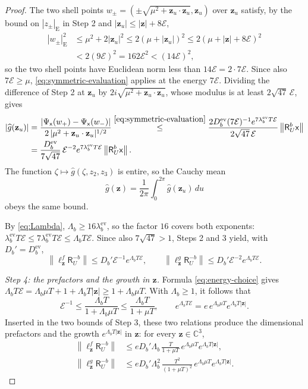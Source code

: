 \documentclass[11pt]{amsart}
\numberwithin{equation}{section}
\theoremstyle{definition}
\newcommand{\C}{\mathbb C}
\newcommand{\Res}{\mathsf R}
\newcommand{\sx}{\mathsf x}
\newcommand{\bz}{\mathbf z}
\newcommand{\Energy}{\mathcal E}
\newcommand{\norm}[1]{\left\|#1\right\|}
\newcommand{\wh}[1]{\widehat{#1}}
\begin{document}
\begin{proof}
The two shell points
\(w_\pm=(\pm\sqrt{\mu^2+\bz_u\cdot\bz_u},\bz_u)\) over \(\bz_u\)
satisfy, by the bound on \(|z_\pm|_{\mathrm E}\) in Step 2 and \(|\bz_u|\le|\bz|+8\Energy\),
\begin{align*}
 |w_\pm|_{\mathrm E}^2
 &\le\mu^2+2|\bz_u|^2
 \le2(\mu+|\bz_u|)^2
 \le2(\mu+|\bz|+8\Energy)^2\\
 &<2(9\Energy)^2=162\Energy^2<(14\Energy)^2,
\end{align*}
so the two shell points have Euclidean norm less than
\(14\Energy=2\cdot7\Energy\). Since also \(7\Energy\ge\mu\),
\eqref{eq:symmetric-evaluation} applies at the energy \(7\Energy\).
Dividing the difference of Step 2 at \(\bz_u\) by
\(2i\sqrt{\mu^2+\bz_u\cdot\bz_u}\), whose modulus is at least
\(2\sqrt{47}\,\Energy\), gives
\begin{align*}
 |\wh g(\bz_u)|
 &=\frac{|\Psi_\sx(w_+)-\Psi_\sx(w_-)|}
        {2\,|\mu^2+\bz_u\cdot\bz_u|^{1/2}}
 \overset{\eqref{eq:symmetric-evaluation}}{\le}
 \frac{2D_b^{\mathrm{ev}}(7\Energy)^{-1}
       e^{7\lambda_b^{\mathrm{ev}}T\Energy}}
      {2\sqrt{47}\,\Energy}
 \norm{\Res_U^b\sx}\\
 &=\frac{D_b^{\mathrm{ev}}}{7\sqrt{47}}\,\Energy^{-2}
   e^{7\lambda_b^{\mathrm{ev}}T\Energy}\norm{\Res_U^b\sx}.
\end{align*}
The function \(\zeta\mapsto\wh g(\zeta,z_2,z_3)\) is entire, so the
Cauchy mean
\[
 \wh g(\bz)=\frac1{2\pi}\int_0^{2\pi}\wh g(\bz_u)\,du
\]
obeys the same bound.

By \eqref{eq:Lambda}, \(\Lambda_b\ge16\lambda_b^{\mathrm{ev}}\), so the
factor \(16\) covers both exponents:
\(\lambda_b^{\mathrm{ev}}T\Energy\le7\lambda_b^{\mathrm{ev}}T\Energy
\le\Lambda_bT\Energy\). Since also \(7\sqrt{47}>1\),
Steps 2 and 3 yield, with \(D_b'=D_b^{\mathrm{ev}}\),
\[
 \norm{\ell_{\bz}^f\Res_U^{-b}}
 \le D_b'\Energy^{-1}e^{\Lambda_bT\Energy},\qquad
 \norm{\ell_{\bz}^g\Res_U^{-b}}
 \le D_b'\Energy^{-2}e^{\Lambda_bT\Energy}.
\]

\smallskip
\emph{Step 4: the prefactors and the growth in \(\bz\).}
Formula \eqref{eq:energy-choice} gives
\(\Lambda_bT\Energy=\Lambda_b\mu T+1+\Lambda_bT|\bz|\ge1+\Lambda_b\mu T\).
With \(\Lambda_b\ge1\), it follows that
\[
 \Energy^{-1}\le\frac{\Lambda_bT}{1+\Lambda_b\mu T}
 \le\frac{\Lambda_bT}{1+\mu T},\qquad
 e^{\Lambda_bT\Energy}=e\,e^{\Lambda_b\mu T}e^{\Lambda_bT|\bz|}.
\]
Inserted in the two bounds of Step 3, these two relations produce the
dimensional prefactors and the growth \(e^{\Lambda_bT|\bz|}\) in \(\bz\):
for every \(\bz\in\C^3\),
\begin{align*}
 \norm{\ell_{\bz}^f\Res_U^{-b}}
 &\le eD_b'\Lambda_b\,\frac{T}{1+\mu T}\,
   e^{\Lambda_b\mu T}e^{\Lambda_bT|\bz|},\\
 \norm{\ell_{\bz}^g\Res_U^{-b}}
 &\le eD_b'\Lambda_b^2\,\frac{T^2}{(1+\mu T)^2}\,
   e^{\Lambda_b\mu T}e^{\Lambda_bT|\bz|}.
\end{align*}


\end{proof}
\end{document}
